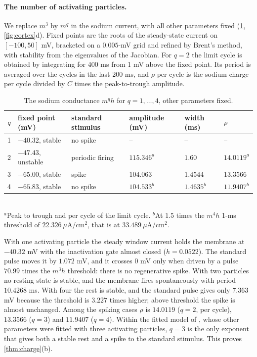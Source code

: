 \documentclass[11pt]{article}
\theoremstyle{definition}\newtheorem{definition}[theorem]{Definition}
\theoremstyle{remark}\newtheorem{remark}[theorem]{Remark}
\begin{document}
\paragraph{The number of activating particles.} We replace $m^3$ by $m^q$ in the sodium current, with all other parameters fixed (\cref{tab:exp}, \cref{fig:cortex}d). Fixed points are the roots of the steady-state current on $[-100,50]$ mV, bracketed on a $0.005$-mV grid and refined by Brent's method, with stability from the eigenvalues of the Jacobian. For $q=2$ the limit cycle is obtained by integrating for 400 ms from 1 mV above the fixed point. Its period is averaged over the cycles in the last 200 ms, and $\rho$ per cycle is the sodium charge per cycle divided by $C$ times the peak-to-trough amplitude.

\begin{table}[htbp]\centering\small
\caption{The sodium conductance $m^qh$ for $q=1,\dots,4$, other parameters fixed.}\label{tab:exp}
\begin{tabular}{@{}clllll@{}}\toprule
$q$ & fixed point (mV) & standard stimulus & amplitude (mV) & width (ms) & $\rho$\\\midrule
1 & $-40.32$, stable & no spike & -- & -- & --\\
2 & $-47.43$, unstable & periodic firing & $115.346^a$ & $1.60$ & $14.0119^a$\\
3 & $-65.00$, stable & spike & $104.063$ & $1.4544$ & $13.3566$\\
4 & $-65.83$, stable & no spike & $104.533^b$ & $1.4635^b$ & $11.9407^b$\\\bottomrule
\end{tabular}\\[2pt]
{\footnotesize $^a$Peak to trough and per cycle of the limit cycle. $^b$At $1.5$ times the $m^4h$ 1-ms threshold of $22.326\ \mu$A/cm$^2$, that is at $33.489\ \mu$A/cm$^2$.}
\end{table}

With one activating particle the steady window current holds the membrane at $-40.32$ mV with the inactivation gate almost closed ($h=0.0522$). The standard pulse moves it by $1.072$ mV, and it crosses $0$ mV only when driven by a pulse $70.99$ times the $m^3h$ threshold: there is no regenerative spike. With two particles no resting state is stable, and the membrane fires spontaneously with period $10.4268$ ms. With four the rest is stable, and the standard pulse gives only $7.363$ mV because the threshold is $3.227$ times higher; above threshold the spike is almost unchanged. Among the spiking cases $\rho$ is $14.0119$ ($q=2$, per cycle), $13.3566$ ($q=3$) and $11.9407$ ($q=4$). Within the fitted model of \cite{HH}, whose other parameters were fitted with three activating particles, $q=3$ is the only exponent that gives both a stable rest and a spike to the standard stimulus. This proves \cref{thm:charge}(b).
\end{document}
